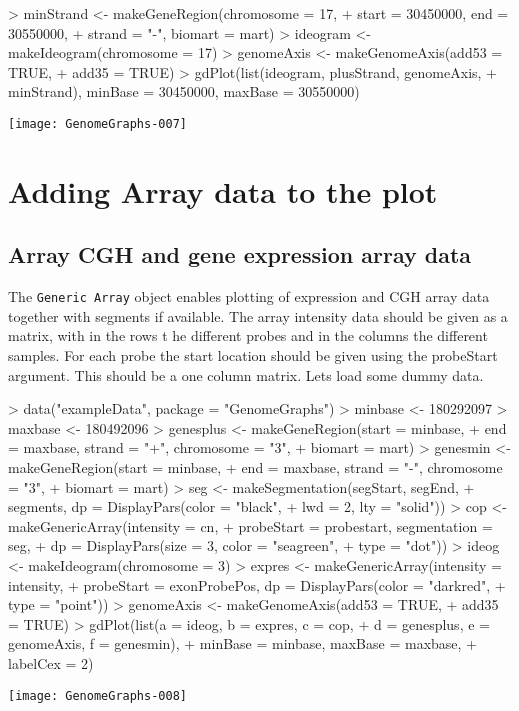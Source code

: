 \documentclass[11pt]{article}
\newcommand{\Robject}[1]{{\texttt{#1}}}
\begin{document}
\begin{Schunk}
\begin{Sinput}
> minStrand <- makeGeneRegion(chromosome = 17, 
+     start = 30450000, end = 30550000, 
+     strand = "-", biomart = mart)
> ideogram <- makeIdeogram(chromosome = 17)
> genomeAxis <- makeGenomeAxis(add53 = TRUE, 
+     add35 = TRUE)
> gdPlot(list(ideogram, plusStrand, genomeAxis, 
+     minStrand), minBase = 30450000, maxBase = 30550000)
\end{Sinput}
\end{Schunk}
\texttt{[image: GenomeGraphs-007]}

\section{Adding Array data to the plot}

\subsection{Array CGH and gene expression array data}
The \Robject{Generic Array} object enables plotting of expression and
CGH array data together with segments if available.  The array
intensity data should be given as a matrix, with in the rows t he
different probes and in the columns the different samples.  For each
probe the start location should be given using the probeStart
argument.  This should be a one column matrix.  Lets load some dummy
data.

\begin{Schunk}
\begin{Sinput}
> data("exampleData", package = "GenomeGraphs")
> minbase <- 180292097
> maxbase <- 180492096
> genesplus <- makeGeneRegion(start = minbase, 
+     end = maxbase, strand = "+", chromosome = "3", 
+     biomart = mart)
> genesmin <- makeGeneRegion(start = minbase, 
+     end = maxbase, strand = "-", chromosome = "3", 
+     biomart = mart)
> seg <- makeSegmentation(segStart, segEnd, 
+     segments, dp = DisplayPars(color = "black", 
+         lwd = 2, lty = "solid"))
> cop <- makeGenericArray(intensity = cn, 
+     probeStart = probestart, segmentation = seg, 
+     dp = DisplayPars(size = 3, color = "seagreen", 
+         type = "dot"))
> ideog <- makeIdeogram(chromosome = 3)
> expres <- makeGenericArray(intensity = intensity, 
+     probeStart = exonProbePos, dp = DisplayPars(color = "darkred", 
+         type = "point"))
> genomeAxis <- makeGenomeAxis(add53 = TRUE, 
+     add35 = TRUE)
> gdPlot(list(a = ideog, b = expres, c = cop, 
+     d = genesplus, e = genomeAxis, f = genesmin), 
+     minBase = minbase, maxBase = maxbase, 
+     labelCex = 2)
\end{Sinput}
\end{Schunk}
\texttt{[image: GenomeGraphs-008]}
\end{document}
